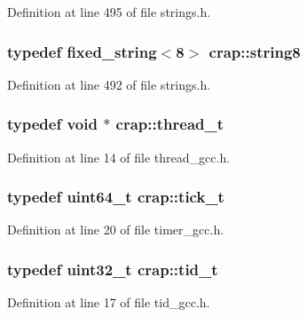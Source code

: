Definition at line 495 of file strings.\+h.

\hypertarget{namespacecrap_ac2aa8c51f82e95df485b8fff38837fcb}{}
\subsubsection[{string8}]{\setlength{\rightskip}{0pt plus 5cm}typedef {\bf fixed\+\_\+string}$<$8$>$ {\bf crap\+::string8}}\label{namespacecrap_ac2aa8c51f82e95df485b8fff38837fcb}


Definition at line 492 of file strings.\+h.

\hypertarget{namespacecrap_acd6ada6ce68b7a664e02cc09a05cdeb3}{}
\subsubsection[{thread\+\_\+t}]{\setlength{\rightskip}{0pt plus 5cm}typedef void $\ast$ {\bf crap\+::thread\+\_\+t}}\label{namespacecrap_acd6ada6ce68b7a664e02cc09a05cdeb3}


Definition at line 14 of file thread\+\_\+gcc.\+h.

\hypertarget{namespacecrap_ad017b1c2078d1f4d59557eda5d95b149}{}
\subsubsection[{tick\+\_\+t}]{\setlength{\rightskip}{0pt plus 5cm}typedef uint64\+\_\+t {\bf crap\+::tick\+\_\+t}}\label{namespacecrap_ad017b1c2078d1f4d59557eda5d95b149}


Definition at line 20 of file timer\+\_\+gcc.\+h.

\hypertarget{namespacecrap_ac21fdaa6d61c6dfcc98ddbb9fd7566ca}{}
\subsubsection[{tid\+\_\+t}]{\setlength{\rightskip}{0pt plus 5cm}typedef uint32\+\_\+t {\bf crap\+::tid\+\_\+t}}\label{namespacecrap_ac21fdaa6d61c6dfcc98ddbb9fd7566ca}


Definition at line 17 of file tid\+\_\+gcc.\+h.

\hypertarget{namespacecrap_a5054f00dc3a0c41f32137cf2233a72eb}{}
